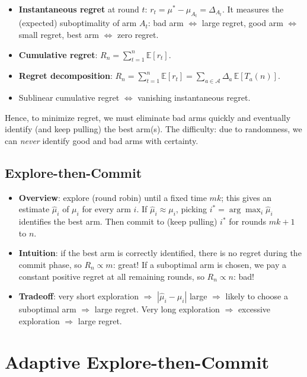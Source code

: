\begin{itemize}
    \item \textbf{Instantaneous regret} at round $t$: $r_t = \mu^* - \mu_{A_t} = \Delta_{A_t}$. It measures the (expected) suboptimality of arm $A_t$: bad arm $\Leftrightarrow$ large regret, good arm $\Leftrightarrow$ small regret, best arm $\Leftrightarrow$ zero regret.
    \item \textbf{Cumulative regret}: $R_n = \sum_{t=1}^n \mathbb{E}[r_t]$.
    \item \textbf{Regret decomposition}: $R_n = \sum_{t=1}^n \mathbb{E}[r_t] = \sum_{a \in \mathcal{A}} \Delta_a\, \mathbb{E}[T_a(n)]$.
    \item Sublinear cumulative regret $\Leftrightarrow$ vanishing instantaneous regret.
\end{itemize}
Hence, to minimize regret, we must eliminate bad arms quickly and eventually identify (and keep pulling) the best arm(s). The difficulty: due to randomness, we can \emph{never} identify good and bad arms with certainty.

\subsection{Explore-then-Commit}

\begin{itemize}
    \item \textbf{Overview}: explore (round robin) until a fixed time $mk$; this gives an estimate $\hat{\mu}_i$ of $\mu_i$ for every arm $i$. If $\hat{\mu}_i \approx \mu_i$, picking $i^* = \arg\max_i \hat{\mu}_i$ identifies the best arm. Then commit to (keep pulling) $i^*$ for rounds $mk+1$ to $n$.
    \item \textbf{Intuition}: if the best arm is correctly identified, there is no regret during the commit phase, so $R_n \propto m$: great! If a suboptimal arm is chosen, we pay a constant positive regret at all remaining rounds, so $R_n \propto n$: bad!
    \item \textbf{Tradeoff}: very short exploration $\Rightarrow$ $|\hat{\mu}_i - \mu_i|$ large $\Rightarrow$ likely to choose a suboptimal arm $\Rightarrow$ large regret. Very long exploration $\Rightarrow$ excessive exploration $\Rightarrow$ large regret.
\end{itemize}

\section{Adaptive Explore-then-Commit}

